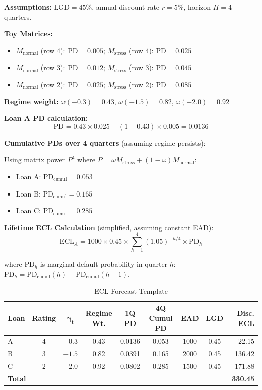 \documentclass[12pt,a4paper]{article}
\newcommand{\Mnormal}{M_{\text{normal}}}
\newcommand{\Mstress}{M_{\text{stress}}}
\newcommand{\ECL}{\text{ECL}}
\newcommand{\LGD}{\text{LGD}}
\newcommand{\PD}{\text{PD}}
\begin{document}
\textbf{Assumptions:} $\LGD = 45\%$, annual discount rate $r = 5\%$, horizon $H = 4$ quarters.

\textbf{Toy Matrices:}
\begin{itemize}[noitemsep]
    \item $\Mnormal$ (row 4): $\PD = 0.005$; $\Mstress$ (row 4): $\PD = 0.025$
    \item $\Mnormal$ (row 3): $\PD = 0.012$; $\Mstress$ (row 3): $\PD = 0.045$
    \item $\Mnormal$ (row 2): $\PD = 0.025$; $\Mstress$ (row 2): $\PD = 0.085$
\end{itemize}

\textbf{Regime weight:} $\omega(-0.3) = 0.43$, $\omega(-1.5) = 0.82$, $\omega(-2.0) = 0.92$

\textbf{Loan A PD calculation:}
\begin{equation*}
\PD = 0.43 \times 0.025 + (1 - 0.43) \times 0.005 = 0.0136
\end{equation*}

\textbf{Cumulative PDs over 4 quarters} (assuming regime persists):

Using matrix power $P^4$ where $P = \omega \Mstress + (1-\omega)\Mnormal$:
\begin{itemize}[noitemsep]
    \item Loan A: $\PD_{\text{cumul}} = 0.053$
    \item Loan B: $\PD_{\text{cumul}} = 0.165$
    \item Loan C: $\PD_{\text{cumul}} = 0.285$
\end{itemize}

\textbf{Lifetime ECL Calculation} (simplified, assuming constant EAD):
\begin{equation*}
\ECL_A = 1000 \times 0.45 \times \sum_{h=1}^4 (1.05)^{-h/4} \times \PD_h
\end{equation*}

where $\PD_h$ is marginal default probability in quarter $h$: $\PD_h = \PD_{\text{cumul}}(h) - \PD_{\text{cumul}}(h-1)$.

\begin{table}[H]
\centering
\caption{ECL Forecast Template}
\label{tab:ecl_forecast}
\begin{tabular}{@{}lcccccccr@{}}
\toprule
\textbf{Loan} & \textbf{Rating} & $\boldsymbol{\gamma_t}$ & \textbf{Regime Wt.} & \textbf{1Q PD} & \textbf{4Q Cumul PD} & \textbf{EAD} & \textbf{LGD} & \textbf{Disc. ECL} \\
\midrule
A & 4 & $-0.3$ & 0.43 & 0.0136 & 0.053 & 1000 & 0.45 & 22.15 \\
B & 3 & $-1.5$ & 0.82 & 0.0391 & 0.165 & 2000 & 0.45 & 136.42 \\
C & 2 & $-2.0$ & 0.92 & 0.0802 & 0.285 & 1500 & 0.45 & 171.88 \\
\midrule
\multicolumn{8}{l}{\textbf{Total}} & \textbf{330.45} \\
\bottomrule
\end{tabular}
\end{table}
\end{document}
